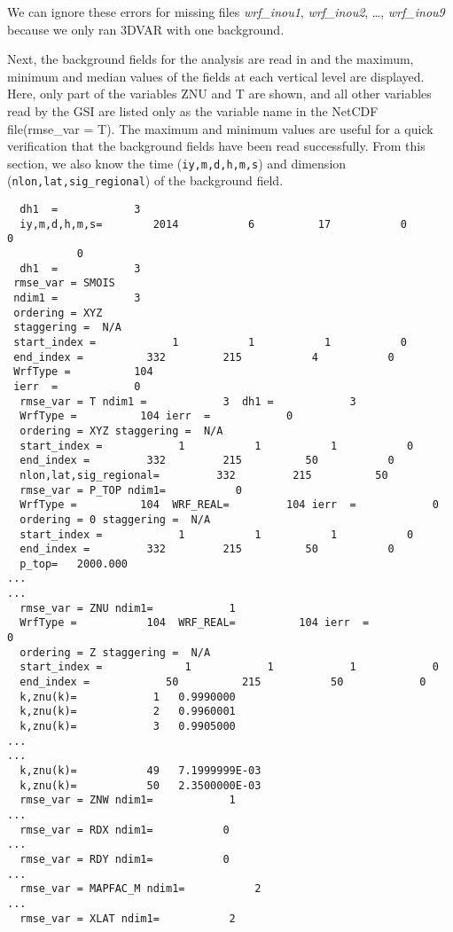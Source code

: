We can ignore these errors for missing files \textit{wrf\_inou1}, \textit{wrf\_inou2}, \ldots , \textit{wrf\_inou9} because we only ran 3DVAR with one background.

Next, the background fields for the analysis are read in and the maximum, minimum and median values of the fields at each vertical level are displayed. Here, only part of the variables ZNU and T are shown, and all other variables read by the GSI are listed only as the variable name in the NetCDF file(rmse\_var = T). The maximum and minimum values are useful for a quick verification that the background fields have been read successfully. From this section, we also know the time (\verb|iy,m,d,h,m,s|) and dimension (\verb|nlon,lat,sig_regional|) of the background field.

\begin{scriptsize}
\begin{verbatim}
  dh1  =            3
  iy,m,d,h,m,s=        2014           6          17           0           0
           0
  dh1  =            3
 rmse_var = SMOIS
 ndim1 =            3
 ordering = XYZ
 staggering =  N/A
 start_index =            1           1           1           0
 end_index =          332         215           4           0
 WrfType =          104
 ierr  =            0
  rmse_var = T ndim1 =            3  dh1 =            3
  WrfType =          104 ierr  =            0
  ordering = XYZ staggering =  N/A
  start_index =            1           1           1           0  
  end_index =         332         215          50           0
  nlon,lat,sig_regional=         332         215          50
  rmse_var = P_TOP ndim1=           0
  WrfType =          104  WRF_REAL=         104 ierr  =            0
  ordering = 0 staggering =  N/A
  start_index =            1           1           1           0  
  end_index =         332         215          50           0
  p_top=   2000.000
...
...
  rmse_var = ZNU ndim1=            1
  WrfType =           104  WRF_REAL=          104 ierr  =             0
  ordering = Z staggering =  N/A
  start_index =             1            1            1            0
  end_index =            50          215           50            0
  k,znu(k)=            1   0.9990000
  k,znu(k)=            2   0.9960001
  k,znu(k)=            3   0.9905000
...
...
  k,znu(k)=           49   7.1999999E-03
  k,znu(k)=           50   2.3500000E-03
  rmse_var = ZNW ndim1=            1
...
  rmse_var = RDX ndim1=           0
...
  rmse_var = RDY ndim1=           0
...
  rmse_var = MAPFAC_M ndim1=           2
...
  rmse_var = XLAT ndim1=           2

\end{verbatim}
\end{scriptsize}
